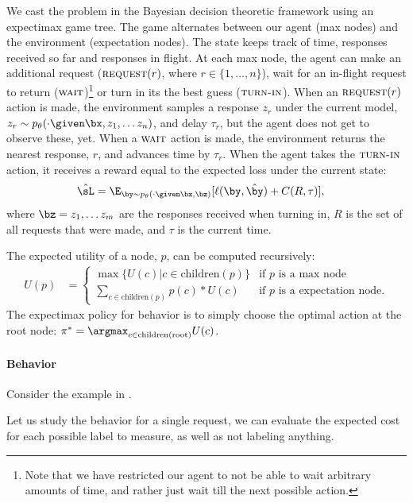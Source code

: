 We cast the problem in the Bayesian decision theoretic framework using an expectimax game tree.
The game alternates between our agent (max nodes) and the environment (expectation nodes).
The state keeps track of time, responses received so far and responses in flight.
At each max node, the agent can make an additional request ($\operatorname{\textsc{request}}(r)$, where $r \in \{1, \ldots, n\}$), wait for an in-flight request to return ($\operatorname{\textsc{wait}}$)\footnote{Note that we have restricted our agent to not be able to wait arbitrary amounts of time, and rather just wait till the next possible action.}
or turn in its the best guess ($\operatorname{\textsc{turn-in}}$).
When an $\operatorname{\textsc{request}}(r)$ action is made, the environment samples a response $z_r$ under the current model, $z_r \sim \p(\cdot \given \bx, z_1, \dots z_n)$, and delay $\tau_r$, but the agent does not get to observe these, yet.
When a $\operatorname{\textsc{wait}}$ action is made, the environment returns the nearest response, $r$, and advances time by $\tau_r$\expand.
When the agent takes the $\operatorname{\textsc{turn-in}}$ action, it receives a reward equal to the expected loss under the current state:
\begin{align*}
  \hat\sL &= \E_{\by \sim \p(\cdot \given \bx, \bz)}[\ell(\by, \byt) + C(R, \tau)],
\end{align*}
where $\bz = z_1, \dots z_m$ are the responses received when turning in, $R$ is the set of all requests that were made, and $\tau$ is the current time.

The expected utility of a node, $p$, can be computed recursively:
\begin{align*}
  U(p) &= 
  \begin{cases}
    \max\{ U(c) | c \in \textrm{children}(p) \} & \textrm{if $p$ is a max node} \\
    \sum_{c \in \textrm{children}(p)} p(c) * U(c) & \textrm{if $p$ is a expectation node}.
  \end{cases}
\end{align*}
The expectimax policy for behavior is to simply choose the optimal action at the root node: $\pi^* = \argmax_{c \in \textrm{children}(\textrm{root})} U(c)$.

\paragraph{Behavior}
Consider the example in .


Let us study the behavior for a single request, we can evaluate the expected cost for each possible label to measure, as well as not labeling anything.

